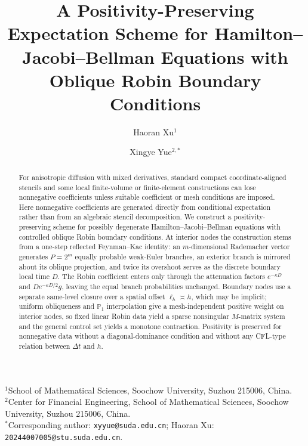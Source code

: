 \documentclass[11pt]{article}
\title{A Positivity-Preserving Expectation Scheme for Hamilton--Jacobi--Bellman Equations with Oblique Robin Boundary Conditions}
\author{Haoran Xu$^1$ \and Xingye Yue$^{2,*}$}
\date{}
\theoremstyle{definition}
\theoremstyle{remark}
\begin{document}
	\maketitle
	\begin{center}
		\small
		$^1$School of Mathematical Sciences, Soochow University, Suzhou 215006, China.\\
		$^2$Center for Financial Engineering, School of Mathematical Sciences, Soochow University, Suzhou 215006, China.\\
		$^*$Corresponding author: \texttt{xyyue@suda.edu.cn};
		Haoran Xu: \texttt{20244007005@stu.suda.edu.cn}.
	\end{center}
\begin{abstract}
	For anisotropic diffusion with mixed derivatives, standard compact
	coordinate-aligned stencils and some local finite-volume or finite-element
	constructions can lose nonnegative coefficients unless suitable coefficient
	or mesh conditions are imposed.  Here nonnegative coefficients are generated
	directly from conditional expectation rather than from an algebraic stencil
	decomposition. We construct a positivity-preserving scheme for
	possibly degenerate Hamilton--Jacobi--Bellman equations with controlled
	oblique Robin boundary conditions. At interior nodes the construction stems
	from a one-step reflected Feynman--Kac identity: an $m$-dimensional Rademacher
	vector generates $P=2^m$ equally probable weak-Euler branches, an exterior
	branch is mirrored about its oblique projection, and twice its overshoot
	serves as the discrete boundary local time $D$. The Robin coefficient enters
	only through the attenuation factors $e^{-\kappa D}$ and $De^{-\kappa D/2}g$,
	leaving the equal branch probabilities unchanged. Boundary nodes use a
	separate same-level closure over a spatial offset $\ell_h\asymp h$, which may
	be implicit; uniform obliqueness and $\mathbb P_1$ interpolation give a
	mesh-independent positive weight on interior nodes, so fixed linear Robin data
	yield a sparse nonsingular $M$-matrix system and the general control set
	yields a monotone contraction. Positivity is preserved for nonnegative data
	without a diagonal-dominance condition and without any CFL-type relation
	between $\Delta t$ and $h$.
	

\end{abstract}
\end{document}
